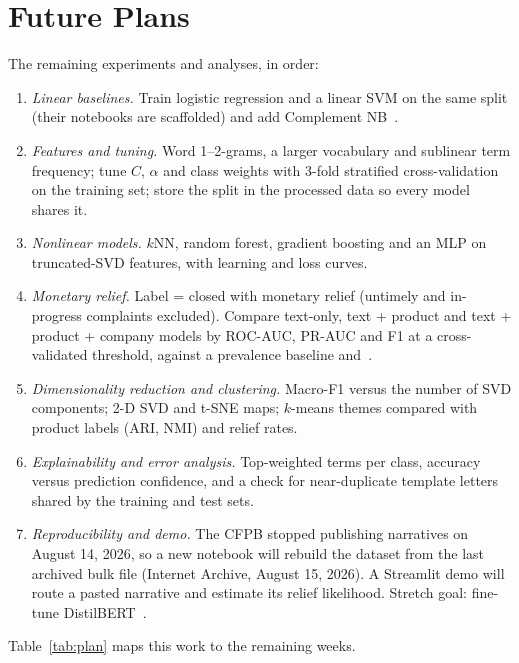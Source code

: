 \documentclass[conference]{IEEEtran}
\begin{document}
\section{Future Plans}
\label{sec:future}
The remaining experiments and analyses, in order:
\begin{enumerate}
\item \textit{Linear baselines.} Train logistic regression and a linear SVM on the same split (their notebooks are scaffolded) and add Complement NB~\cite{rennie}.
\item \textit{Features and tuning.} Word 1--2-grams, a larger vocabulary and sublinear term frequency; tune $C$, $\alpha$ and class weights with 3-fold stratified cross-validation on the training set; store the split in the processed data so every model shares it.
\item \textit{Nonlinear models.} $k$NN, random forest, gradient boosting and an MLP on truncated-SVD features, with learning and loss curves.
\item \textit{Monetary relief.} Label = closed with monetary relief (untimely and in-progress complaints excluded). Compare text-only, text + product and text + product + company models by ROC-AUC, PR-AUC and F1 at a cross-validated threshold, against a prevalence baseline and~\cite{wang}.
\item \textit{Dimensionality reduction and clustering.} Macro-F1 versus the number of SVD components; 2-D SVD and t-SNE maps; $k$-means themes compared with product labels (ARI, NMI) and relief rates.
\item \textit{Explainability and error analysis.} Top-weighted terms per class, accuracy versus prediction confidence, and a check for near-duplicate template letters shared by the training and test sets.
\item \textit{Reproducibility and demo.} The CFPB stopped publishing narratives on August 14, 2026, so a new notebook will rebuild the dataset from the last archived bulk file (Internet Archive, August 15, 2026). A Streamlit demo will route a pasted narrative and estimate its relief likelihood. Stretch goal: fine-tune DistilBERT~\cite{distilbert}.
\end{enumerate}
Table~\ref{tab:plan} maps this work to the remaining weeks.
\end{document}

